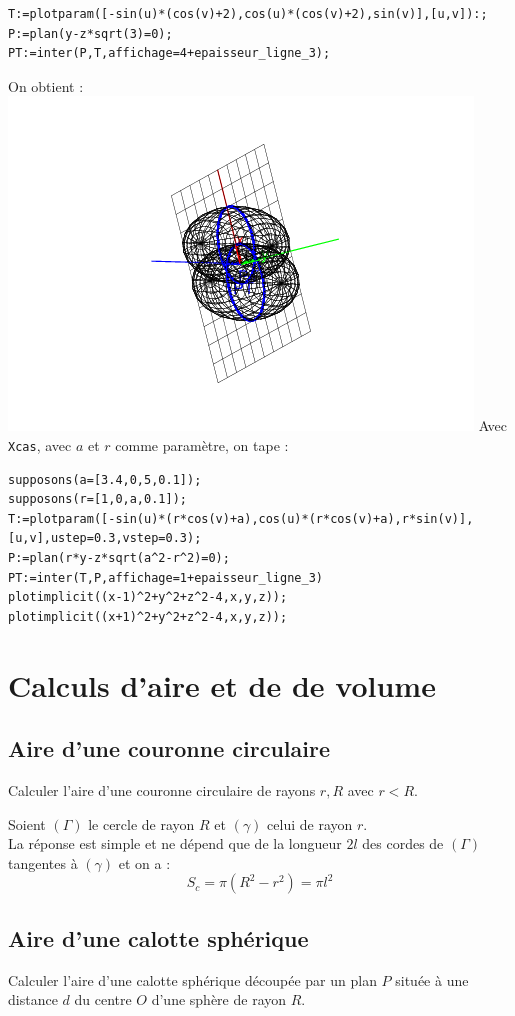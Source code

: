 \documentclass[a4paper,11pt]{book}
\begin{document}
\begin{verbatim}
T:=plotparam([-sin(u)*(cos(v)+2),cos(u)*(cos(v)+2),sin(v)],[u,v]):;
P:=plan(y-z*sqrt(3)=0);
PT:=inter(P,T,affichage=4+epaisseur_ligne_3);
\end{verbatim}
On obtient :\\
\includegraphics[width=\textwidth]{tore0}
Avec {\tt Xcas}, avec $a$ et $r$ comme param\`etre, on tape :\\
\begin{verbatim}
supposons(a=[3.4,0,5,0.1]);
supposons(r=[1,0,a,0.1]);
T:=plotparam([-sin(u)*(r*cos(v)+a),cos(u)*(r*cos(v)+a),r*sin(v)],[u,v],ustep=0.3,vstep=0.3);
P:=plan(r*y-z*sqrt(a^2-r^2)=0);
PT:=inter(T,P,affichage=1+epaisseur_ligne_3)
plotimplicit((x-1)^2+y^2+z^2-4,x,y,z));
plotimplicit((x+1)^2+y^2+z^2-4,x,y,z));
\end{verbatim}

\section{Calculs d'aire et de de volume}
\subsection{Aire d'une couronne circulaire}
Calculer l'aire d'une couronne circulaire de rayons $r,R$ avec $r<R$.

Soient  $(\Gamma)$ le cercle de rayon $R$ et $(\gamma)$ celui de rayon $r$.\\
La r\'eponse est simple et ne d\'epend que de la longueur $2l$ des cordes de
$(\Gamma)$ tangentes \`a $(\gamma)$ et on a :
$$S_c=\pi(R^2-r^2)=\pi l^2$$
\subsection{Aire d'une calotte sph\'erique}
Calculer l'aire d'une calotte sph\'erique d\'ecoup\'ee par un plan $P$
situ\'ee \`a une distance $d$ du centre $O$ d'une sph\`ere de rayon $R$.
\end{document}

